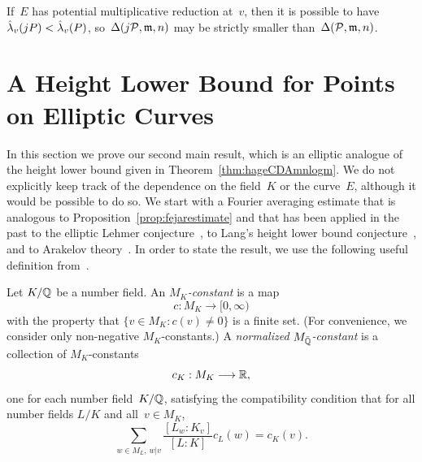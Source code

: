\documentclass[12pt,reqno]{amsart}
\begin{document}
\begin{remark}
If~$E$ has potential multiplicative reduction at~$v$, then it is
possible to have $\hat\lambda_v(jP)<\hat\lambda_v(P)$, so~$\Delta(j{\mathcal P},{\mathfrak{m}},n)$ may
be strictly smaller than~$\Delta({\mathcal P},{\mathfrak{m}},n)$.
\end{remark}

\section{A Height Lower Bound for Points on Elliptic Curves}
\label{section:mainresult}

In this section we prove our second main result, which is an elliptic
analogue of the height lower bound given in
Theorem~\ref{thm:hageCDAmnlogm}.  We do not explicitly keep track of
the dependence on the field~$K$ or the curve~$E$, although it would be
possible to do so.  We start with a Fourier averaging estimate that is
analogous to Proposition~\ref{prop:fejarestimate} and that has been
applied in the past to the elliptic Lehmer conjecture~\cite{HiSi1}, to
Lang's height lower bound conjecture~\cite{HiSi2}, and to Arakelov
theory~\cite{LangAT}.  In order to state the result, we use the
following useful definition from~\cite{LangDG}.

\begin{definition}
Let $K/\mathbb{Q}$ be a number field. An \emph{$M_K$-constant} is a map
\[
  c : M_K\longrightarrow [0,\infty)
\]
with the property that $\{v\in M_K:c(v)\ne0\}$ is a finite set.  (For
convenience, we consider only non-negative $M_K$-constants.)  A
\emph{normalized} \emph{$M_{\bar{\mathbb{Q}}}$-constant} is a collection of
$M_K$-constants
\[
  c_K : M_K\longrightarrow\mathbb{R},
\]
one for each number field~$K/\mathbb{Q}$, satisfying the compatibility
condition that for all number fields $L/K$ and all~$v\in M_K$,
\[
  \sum_{w\in M_L,\, w|v} \frac{[L_w:K_v]}{[L:K]}c_L(w) = c_K(v).
\]
\end{definition}
\end{document}

